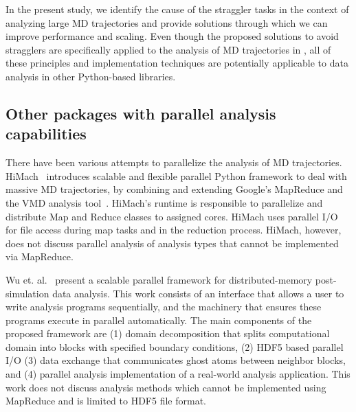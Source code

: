 In the present study, we identify the cause of the straggler tasks in the context of analyzing large MD trajectories and provide solutions through which we can improve performance and scaling.
Even though the proposed solutions to avoid stragglers are specifically applied to the analysis of MD trajectories in , all of these principles and implementation techniques are potentially applicable to data analysis in other Python-based libraries.

\subsection{Other packages with parallel analysis capabilities}
\label{sec:otherparallel}

There have been various attempts to parallelize the analysis of MD trajectories. 
HiMach~\cite{himach-2008} introduces scalable and flexible parallel Python framework to deal with massive MD trajectories, by combining and extending Google's MapReduce and the VMD analysis tool~\cite{Hum96}. 
HiMach's runtime is responsible to parallelize and distribute Map and Reduce classes to assigned cores.
HiMach uses parallel I/O for file access during map tasks and  in the reduction process. 
HiMach, however, does not discuss parallel analysis of analysis types that cannot be implemented via MapReduce.

Wu et. al.~\cite{Wu_et.al} present a scalable parallel framework for distributed-memory post-simulation data analysis.
This work consists of an interface that allows a user to write analysis programs sequentially, and the machinery that ensures these programs execute in parallel automatically. 
The main components of the proposed framework are (1) domain decomposition that splits computational domain into blocks with specified boundary conditions, (2) HDF5 based parallel I/O (3) data exchange that communicates ghost atoms between neighbor blocks, and (4) parallel analysis implementation of a real-world analysis application.
This work does not discuss analysis methods which cannot be implemented using MapReduce and is limited to HDF5 file format.


